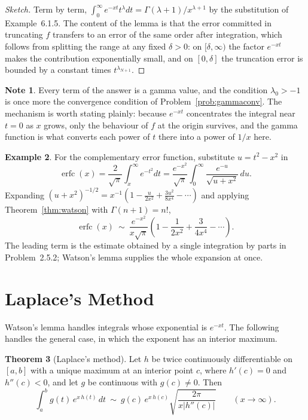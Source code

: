 \documentclass[12pt,a4paper]{report}
\theoremstyle{definition}
\newtheorem{thm}{Theorem}[section]
\newtheorem{exa}[thm]{Example}
\newtheorem{note}[thm]{Note}
\theoremstyle{plain}
\begin{document}
\begin{proof}[Sketch]
Term by term, $\int^{\infty}_{0}e^{-xt}t^{\lambda}dt
= \Gamma(\lambda+1)/x^{\lambda+1}$ by the substitution of
Example~6.1.5. The content of the lemma is that the error committed in
truncating $f$ transfers to an error of the same order after integration, which
follows from splitting the range at any fixed $\delta>0$: on $[\delta,\infty)$
the factor $e^{-xt}$ makes the contribution exponentially small, and on
$[0,\delta]$ the truncation error is bounded by a constant times
$t^{\lambda_{N+1}}$.
\end{proof}

\begin{note}
Every term of the answer is a gamma value, and the condition $\lambda_0>-1$ is
once more the convergence condition of Problem~\ref{prob:gammaconv}. The
mechanism is worth stating plainly: because $e^{-xt}$ concentrates the integral
near $t=0$ as $x$ grows, only the behaviour of $f$ at the origin survives, and
the gamma function is what converts each power of $t$ there into a power of
$1/x$ here.
\end{note}

\begin{exa}
For the complementary error function, substitute $u = t^{2}-x^{2}$ in
$$\operatorname{erfc}(x)
= \frac{2}{\sqrt{\pi}}\int^{\infty}_{x}e^{-t^{2}}dt
= \frac{e^{-x^{2}}}{\sqrt{\pi}}\int^{\infty}_{0}
\frac{e^{-u}}{\sqrt{u+x^{2}}}\,du .$$
Expanding $\left(u+x^{2}\right)^{-1/2}
= x^{-1}\left(1 - \frac{u}{2x^{2}} + \frac{3u^{2}}{8x^{4}} - \cdots\right)$
and applying Theorem~\ref{thm:watson} with $\Gamma(n+1)=n!$,
$$\operatorname{erfc}(x)\ \sim\ \frac{e^{-x^{2}}}{x\sqrt{\pi}}
\left(1 - \frac{1}{2x^{2}} + \frac{3}{4x^{4}} - \cdots\right).$$
The leading term is the estimate obtained by a single integration by parts in
Problem~2.5.2; Watson's lemma supplies the whole expansion at once.
\end{exa}

\section{Laplace's Method}

Watson's lemma handles integrals whose exponential is $e^{-xt}$. The following
handles the general case, in which the exponent has an interior maximum.

\begin{thm}[Laplace's method]
\label{thm:laplacemethod}
Let $h$ be twice continuously differentiable on $[a,b]$ with a unique maximum at
an interior point $c$, where $h'(c)=0$ and $h''(c)<0$, and let $g$ be continuous
with $g(c)\neq0$. Then
$$\int^{b}_{a}g(t)\,e^{x\,h(t)}\,dt
\ \sim\ g(c)\,e^{x\,h(c)}\sqrt{\frac{2\pi}{x\left|h''(c)\right|}}
\qquad (x\to\infty).$$
\end{thm}
\end{document}
